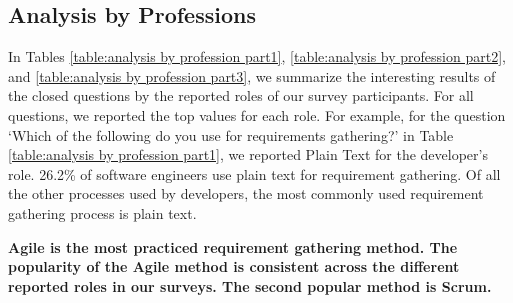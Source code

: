 \subsection{Analysis by Professions}
\label{analyze_by_professions}
In Tables \ref{table:analysis by profession part1}, \ref{table:analysis by
profession part2}, and \ref{table:analysis by profession part3}, we summarize
the interesting results of the closed questions by the reported roles of our survey participants. 
For all questions, we reported the top values for each role. For
example, for the question `Which of the following do you use for requirements
gathering?' in Table \ref{table:analysis by profession part1}, we reported Plain
Text for the developer's role. 26.2\% of software engineers use plain text for
requirement gathering. Of all the other processes used by developers, the most
commonly used requirement gathering process is plain text.





\bf{Agile is the most practiced requirement gathering method. The popularity of the Agile method is consistent across the different reported roles in our surveys.} The second popular method is Scrum.

